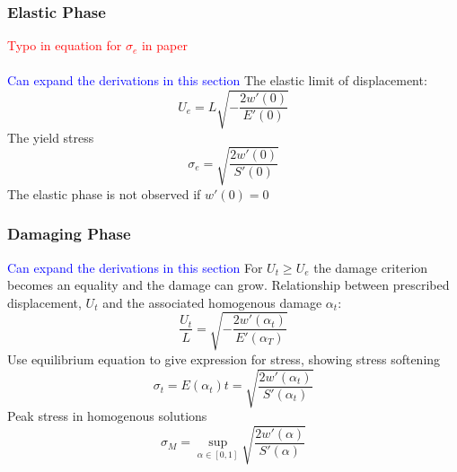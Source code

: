 \documentclass[12pt,3p]{article}
\numberwithin{equation}{section}
\begin{document}
\subsubsection{Elastic Phase}
\textcolor{red}{Typo in equation for $\sigma_e$ in paper} \\ \\
\textcolor{blue}{Can expand the derivations in this section}
The elastic limit of displacement: 
\begin{equation}\label{elasticLimitDisp}
U_e = L \sqrt{- \frac{2 w'(0)}{E'(0)}}
\end{equation}
The yield stress
\begin{equation}\label{yieldStress}
\sigma_e = \sqrt{\frac{2w'(0)}{S'(0)}}
\end{equation}
The elastic phase is not observed if $w'(0) = 0$

\subsubsection{Damaging Phase}
\textcolor{blue}{Can expand the derivations in this section}
For $U_t \geq U_e$ the damage criterion becomes an equality and the damage can grow. Relationship between prescribed displacement, $U_t$ and the associated homogenous damage $\alpha_t$:
\begin{equation}\label{relDispDamage}
\frac{U_t}{L} = \sqrt{- \frac{2 w'(\alpha_t)}{E'(\alpha_T)}}
\end{equation}
Use equilibrium equation to give expression for stress, showing stress softening
\begin{equation}\label{stressTime}
\sigma_t = E(\alpha_t) t = \sqrt{\frac{2 w'(\alpha_t)}{S'(\alpha_t)}}
\end{equation}
Peak stress in homogenous solutions 
\begin{equation}\label{peakStress}
\sigma_M = \sup_{\alpha \in [0, 1]} \sqrt{\frac{2 w'(\alpha)}{S'(\alpha)}}
\end{equation}
\end{document}
